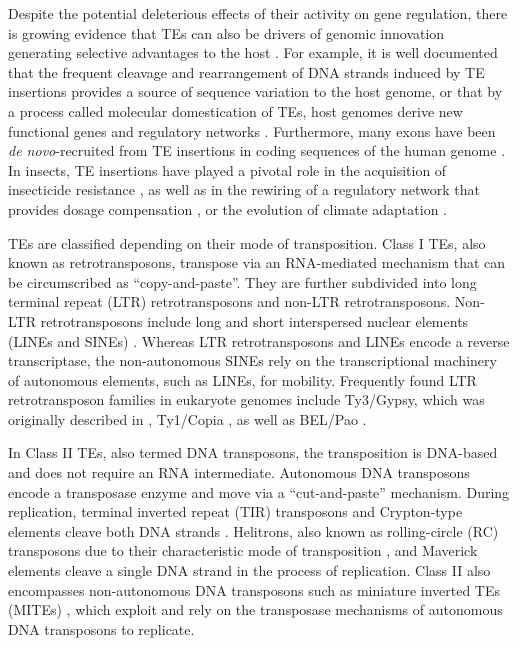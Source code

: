 Despite the potential deleterious effects of their activity on gene
regulation, there is growing evidence that TEs can also be drivers of
genomic innovation generating selective advantages to the host
\citep{Casola2007,Gonzalez2008}. For example, it is well documented that
the frequent cleavage and rearrangement of DNA strands induced by TE
insertions provides a source of sequence variation to the host genome,
or that by a process called molecular domestication of TEs, host genomes
derive new functional genes and regulatory networks
\citep{Feschotte2008,Boehne2008,Santos_2014}.  Furthermore, many exons
have been \emph{de novo}-recruited from TE insertions in coding
sequences of the human genome \citep{Zhang2006}.  In insects, TE
insertions have played a pivotal role in the acquisition of insecticide
resistance \citep{Chen2007,Itokawa2010,Gahan2001}, as well as in the
rewiring of a regulatory network that provides dosage compensation
\citep{Ellison2013}, or the evolution of climate adaptation
\citep{Gonzalez2010,Kim2014}.



TEs are classified depending on their mode of transposition. Class I
TEs, also known as retrotransposons, transpose via an RNA-mediated
mechanism that can be circumscribed as ``copy-and-paste''. They are
further subdivided into long terminal repeat (LTR) retrotransposons and
non-LTR retrotransposons. Non-LTR retrotransposons include long and
short interspersed nuclear elements (LINEs and SINEs)
\citep{Malik1999,Eickbush2008}. Whereas LTR retrotransposons and LINEs
encode a reverse transcriptase, the non-autonomous SINEs rely on the
transcriptional machinery of autonomous elements, such as LINEs, for
mobility. Frequently found LTR retrotransposon families in eukaryote
genomes include Ty3/Gypsy, which was originally described in
 \citep{Marin2000}, Ty1/Copia
\citep{Flavell1992}, as well as BEL/Pao \citep{de_la_Chaux2011}.

In Class II TEs, also termed DNA transposons, the transposition is
DNA-based and does not require an RNA intermediate. Autonomous DNA
transposons encode a transposase enzyme and move via a ``cut-and-paste''
mechanism. During replication, terminal inverted repeat (TIR)
transposons and Crypton-type elements cleave both DNA strands
\citep{Wicker2007}. Helitrons, also known as rolling-circle (RC)
transposons due to their characteristic mode of transposition
\citep{Kapitonov2001}, and Maverick elements \citep{Kapitonov2006}
cleave a single DNA strand in the process of replication. Class II also
encompasses non-autonomous DNA transposons such as miniature inverted
TEs (MITEs) \citep{Shirasawa2012}, which exploit and rely on the
transposase mechanisms of autonomous DNA transposons to replicate.

